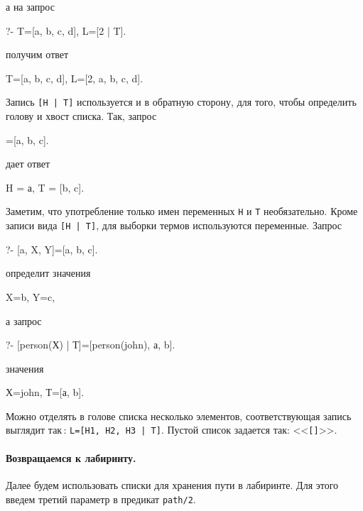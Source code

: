 \documentclass[a4paper,14pt, openany, twoside, draft]{extbook} %
\begin{document}
\noindent а на запрос

\begin{proexp}
?- T=[a, b, c, d], L=[2 | T].
\end{proexp}

\noindent получим ответ

\begin{proexp}
T=[a, b, c, d], L=[2, a, b, c, d].
\end{proexp}

  Запись {\tt [Н | Т]} используется и в обратную сторону, для того, чтобы определить голову и хвост списка.  Так, запрос

\begin{proexp}
[H | T]=[a, b, c].
\end{proexp}

\noindent дает ответ

\begin{proexp}
H = а, T = [b, c].
\end{proexp}


Заметим, что употребление только имен переменных {\tt Н} и {\tt Т} необязательно.  Кроме записи вида {\tt [H | T]}, для выборки термов используются переменные. Запрос

\begin{proexp}
?- [a, X, Y]=[a, b, c].
\end{proexp}

\noindent определит значения

\begin{proexp}
X=b, Y=c,
\end{proexp}

\noindent а запрос

\begin{proexp}
?- [person(Х) | Т]=[person(john), а, b].
\end{proexp}

\noindent значения

\begin{proexp}
Х=john, Т=[а, b].
\end{proexp}

  Можно отделять в голове списка несколько элементов, соответствующая запись выглядит так\,: {\tt L=[H1, H2, H3 | T]}.  Пустой список задается так: <<\texttt{[]}>>.

\paragraph{Возвращаемся к лабиринту.} \label{par:mazelist} Далее будем использовать списки для хранения пути в лабиринте.  Для этого введем третий параметр в предикат \texttt{path/2}.
\end{document}
